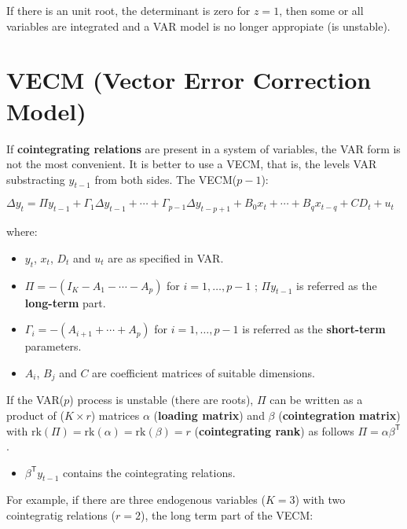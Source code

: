 \documentclass[10pt, a4paper, landscape]{extarticle}
\newcommand{\tr}{\mathsf{T}}
\newcommand{\rk}{\mathrm{rk}}
\begin{document}
\begin{multicols}{2}
If there is an unit root, the determinant is zero for $z=1$, then some or all variables are integrated and a VAR model is no longer appropiate (is unstable).

\columnbreak

\section*{VECM (Vector Error Correction Model)}

If \textbf{cointegrating relations} are present in a system of variables, the VAR form is not the most convenient. It is better to use a VECM, that is, the levels VAR substracting $y_{t - 1}$ from both sides. The VECM($p - 1$):

\begin{center}
	$\Delta y_t = \Pi y_{t - 1} + \Gamma_1 \Delta y_{t - 1} + \cdots + \Gamma_{p - 1} \Delta y_{t - p + 1} + B_0 x_t + \cdots + B_q x_{t - q} + CD_t + u_t$
\end{center}

where:

\begin{itemize}[leftmargin=*]
	\item $y_t$, $x_t$, $D_t$ and $u_t$ are as specified in VAR.
	\item $\Pi = - (I_K - A_1 - \cdots - A_p)$ for $i = 1, \ldots, p - 1$ ; $\Pi y_{t - 1}$ is referred as the \textbf{long-term} part.
	\item $\Gamma_i = - (A_{i + 1} + \cdots + A_p)$ for $i = 1, \ldots, p - 1$ is referred as the \textbf{short-term} parameters.
	\item $A_i$, $B_j$ and $C$ are coefficient matrices of suitable dimensions.
\end{itemize}

If the VAR($p$) process is unstable (there are roots), $\Pi$ can be written as a product of ($K \times r$) matrices $\alpha$ (\textbf{loading matrix}) and $\beta$ (\textbf{cointegration matrix}) with $\rk(\Pi) = \rk(\alpha) = \rk(\beta) = r$ (\textbf{cointegrating rank}) as follows $\Pi = \alpha \beta^\tr$.

\begin{itemize}[leftmargin=*]
	\item $\beta^\tr y_{t - 1}$ contains the cointegrating relations.
\end{itemize}

For example, if there are three endogenous variables ($K=3$) with two cointegratig relations ($r=2$), the long term part of the VECM:


\end{multicols}
\end{document}
